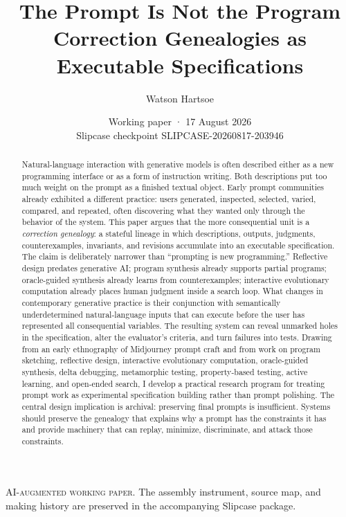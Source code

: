 \documentclass[11pt]{article}
\title{\textbf{The Prompt Is Not the Program}\\[0.35em]\large Correction Genealogies as Executable Specifications}
\author{Watson Hartsoe}
\date{Working paper · 17 August 2026\\\small Slipcase checkpoint SLIPCASE-20260817-203946}
\begin{document}
\maketitle
\begin{center}
\small\textsc{AI-augmented working paper}. The assembly instrument, source map, and making history are preserved in the accompanying Slipcase package.
\end{center}

\begin{abstract}
Natural-language interaction with generative models is often described either as a new programming interface or as a form of instruction writing. Both descriptions put too much weight on the prompt as a finished textual object. Early prompt communities already exhibited a different practice: users generated, inspected, selected, varied, compared, and repeated, often discovering what they wanted only through the behavior of the system. This paper argues that the more consequential unit is a \emph{correction genealogy}: a stateful lineage in which descriptions, outputs, judgments, counterexamples, invariants, and revisions accumulate into an executable specification. The claim is deliberately narrower than ``prompting is new programming.'' Reflective design predates generative AI; program synthesis already supports partial programs; oracle-guided synthesis already learns from counterexamples; interactive evolutionary computation already places human judgment inside a search loop. What changes in contemporary generative practice is their conjunction with semantically underdetermined natural-language inputs that can execute before the user has represented all consequential variables. The resulting system can reveal unmarked holes in the specification, alter the evaluator's criteria, and turn failures into tests. Drawing from an early ethnography of Midjourney prompt craft and from work on program sketching, reflective design, interactive evolutionary computation, oracle-guided synthesis, delta debugging, metamorphic testing, property-based testing, active learning, and open-ended search, I develop a practical research program for treating prompt work as experimental specification building rather than prompt polishing. The central design implication is archival: preserving final prompts is insufficient. Systems should preserve the genealogy that explains why a prompt has the constraints it has and provide machinery that can replay, minimize, discriminate, and attack those constraints.
\end{abstract}
\end{document}
